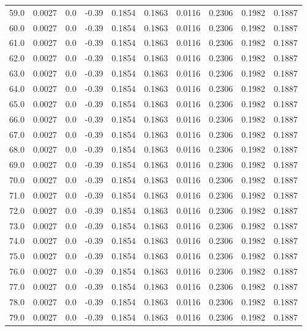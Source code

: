 \begin{longtable}{lrrrrrrrrr}
59.0 & 0.0027 & 0.0 & -0.39 & 0.1854 & 0.1863 & 0.0116 & 0.2306 & 0.1982 & 0.1887 \\
60.0 & 0.0027 & 0.0 & -0.39 & 0.1854 & 0.1863 & 0.0116 & 0.2306 & 0.1982 & 0.1887 \\
61.0 & 0.0027 & 0.0 & -0.39 & 0.1854 & 0.1863 & 0.0116 & 0.2306 & 0.1982 & 0.1887 \\
62.0 & 0.0027 & 0.0 & -0.39 & 0.1854 & 0.1863 & 0.0116 & 0.2306 & 0.1982 & 0.1887 \\
63.0 & 0.0027 & 0.0 & -0.39 & 0.1854 & 0.1863 & 0.0116 & 0.2306 & 0.1982 & 0.1887 \\
64.0 & 0.0027 & 0.0 & -0.39 & 0.1854 & 0.1863 & 0.0116 & 0.2306 & 0.1982 & 0.1887 \\
65.0 & 0.0027 & 0.0 & -0.39 & 0.1854 & 0.1863 & 0.0116 & 0.2306 & 0.1982 & 0.1887 \\
66.0 & 0.0027 & 0.0 & -0.39 & 0.1854 & 0.1863 & 0.0116 & 0.2306 & 0.1982 & 0.1887 \\
67.0 & 0.0027 & 0.0 & -0.39 & 0.1854 & 0.1863 & 0.0116 & 0.2306 & 0.1982 & 0.1887 \\
68.0 & 0.0027 & 0.0 & -0.39 & 0.1854 & 0.1863 & 0.0116 & 0.2306 & 0.1982 & 0.1887 \\
69.0 & 0.0027 & 0.0 & -0.39 & 0.1854 & 0.1863 & 0.0116 & 0.2306 & 0.1982 & 0.1887 \\
70.0 & 0.0027 & 0.0 & -0.39 & 0.1854 & 0.1863 & 0.0116 & 0.2306 & 0.1982 & 0.1887 \\
71.0 & 0.0027 & 0.0 & -0.39 & 0.1854 & 0.1863 & 0.0116 & 0.2306 & 0.1982 & 0.1887 \\
72.0 & 0.0027 & 0.0 & -0.39 & 0.1854 & 0.1863 & 0.0116 & 0.2306 & 0.1982 & 0.1887 \\
73.0 & 0.0027 & 0.0 & -0.39 & 0.1854 & 0.1863 & 0.0116 & 0.2306 & 0.1982 & 0.1887 \\
74.0 & 0.0027 & 0.0 & -0.39 & 0.1854 & 0.1863 & 0.0116 & 0.2306 & 0.1982 & 0.1887 \\
75.0 & 0.0027 & 0.0 & -0.39 & 0.1854 & 0.1863 & 0.0116 & 0.2306 & 0.1982 & 0.1887 \\
76.0 & 0.0027 & 0.0 & -0.39 & 0.1854 & 0.1863 & 0.0116 & 0.2306 & 0.1982 & 0.1887 \\
77.0 & 0.0027 & 0.0 & -0.39 & 0.1854 & 0.1863 & 0.0116 & 0.2306 & 0.1982 & 0.1887 \\
78.0 & 0.0027 & 0.0 & -0.39 & 0.1854 & 0.1863 & 0.0116 & 0.2306 & 0.1982 & 0.1887 \\
79.0 & 0.0027 & 0.0 & -0.39 & 0.1854 & 0.1863 & 0.0116 & 0.2306 & 0.1982 & 0.1887 \\

\end{longtable}
